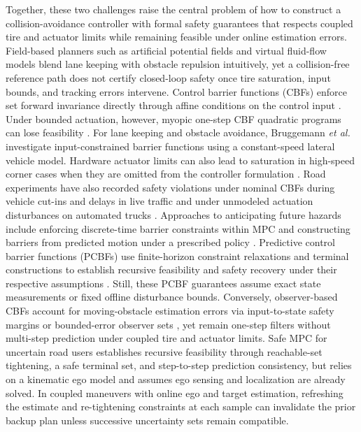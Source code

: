 \documentclass[journal]{IEEEtran}
\theoremstyle{definition}
\begin{document}
Together, these two challenges raise the central problem of how to
construct a collision-avoidance controller with formal safety guarantees
that respects coupled tire and actuator limits while remaining feasible
under online estimation errors. Field-based
planners such as artificial potential fields \cite{WangGaoLiSunCheng2019}
and virtual fluid-flow models \cite{ChengLiLiuLiGuo2021} blend lane keeping
with obstacle repulsion intuitively, yet a collision-free
reference path does not certify closed-loop safety once tire saturation,
input bounds, and tracking errors intervene. Control barrier functions
(CBFs) enforce set forward invariance directly through affine conditions
on the control input \cite{AmesXuGrizzleTabuada2017,XiaoBelta2022}. Under
bounded actuation, however, myopic one-step CBF quadratic programs can
lose feasibility \cite{ZengZhangLiSreenath2021}. For lane keeping and
obstacle avoidance, Bruggemann \emph{et al.}
\cite{BruggemannSteevesKrstic2022} investigate input-constrained barrier
functions using a constant-speed lateral vehicle model. Hardware actuator
limits can also lead to saturation in high-speed corner cases when they are
omitted from the controller formulation
\cite{TayalEtAl2026}. Road experiments have also recorded safety
violations under nominal CBFs during vehicle cut-ins and delays in live
traffic \cite{GunterNiceBuntingSprinkleWork2022} and under unmodeled
actuation disturbances on automated trucks
\cite{AlanTaylorHeAmesOrosz2023}. Approaches to anticipating future
hazards include enforcing discrete-time barrier constraints within MPC
\cite{ZengZhangSreenath2021} and constructing barriers from predicted
motion under a prescribed policy \cite{BlackJankovicSharmaPanagou2023}.
Predictive control barrier functions (PCBFs) use finite-horizon
constraint relaxations and terminal constructions to establish recursive
feasibility and safety recovery under their respective assumptions
\cite{WabersichZeilinger2023,HuangWangMargellosGoulart2025}. Still,
these PCBF guarantees assume exact state measurements or fixed offline
disturbance bounds. Conversely,
observer-based CBFs account for moving-obstacle estimation errors via
input-to-state safety margins \cite{TezukaNakamura2020} or bounded-error
observer sets \cite{QuanZhouFriskChung2025}, yet remain one-step filters
without multi-step prediction under coupled tire and actuator limits.
Safe MPC for uncertain road users \cite{BatkovicGuptaZanonFalcone2023}
establishes recursive feasibility through reachable-set tightening, a
safe terminal set, and step-to-step prediction consistency, but relies on
a kinematic ego model and assumes ego sensing and localization are
already solved. In coupled maneuvers with online ego and target
estimation, refreshing the estimate and re-tightening constraints at each
sample can invalidate the prior backup plan unless successive uncertainty
sets remain compatible.
\end{document}
